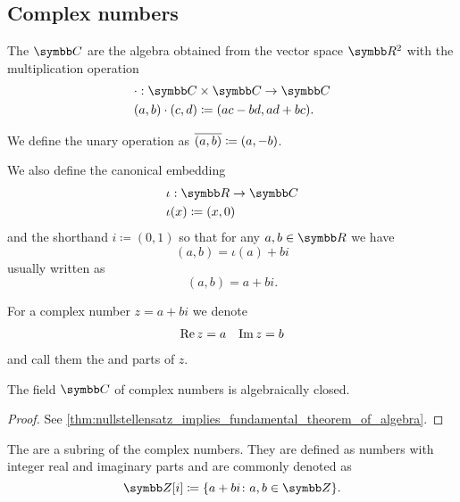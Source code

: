 \subsection{Complex numbers}\label{subsec:complex_numbers}

\begin{definition}\label{def:complex_numbers}
  The  \( \Co \) are the algebra obtained from the vector space \( \R^2 \) with the multiplication operation
  \begin{align*}
    &\cdot: \Co \times \Co \to \Co \\
    &(a, b) \cdot (c, d) \coloneqq (ac - bd, ad + bc).
  \end{align*}

  We define the unary  operation as \( \overline{(a, b)} \coloneqq (a, -b) \).

  We also define the canonical embedding
  \begin{align*}
    &\iota: \R \to \Co \\
    &\iota(x) \coloneqq (x, 0)
  \end{align*}
  and the shorthand \( i \coloneqq (0, 1) \) so that for any \( a, b \in \R \) we have
  \begin{equation*}
    (a, b) = \iota(a) + bi
  \end{equation*}
  usually written as
  \begin{equation*}
    (a, b) = a + bi.
  \end{equation*}

  For a complex number \( z = a + bi \) we denote
  \begin{align*}
    \operatorname{Re} z = a && \operatorname{Im} z = b
  \end{align*}
  and call them the  and  parts of \( z \).
\end{definition}

\begin{theorem}\label{thm:fundamental_theorem_of_algebra}
  The field \( \Co \) of complex numbers is algebraically closed.
\end{theorem}
\begin{proof}
  See \cref{thm:nullstellensatz_implies_fundamental_theorem_of_algebra}.
\end{proof}

\begin{definition}\label{def:gaussian_integers}
  The  are a subring of the complex numbers. They are defined as numbers with integer real and imaginary parts and are commonly denoted as
  \begin{equation*}
    \Z[i] \coloneqq \{ a + bi \colon a, b \in \Z \}.
  \end{equation*}
\end{definition}
